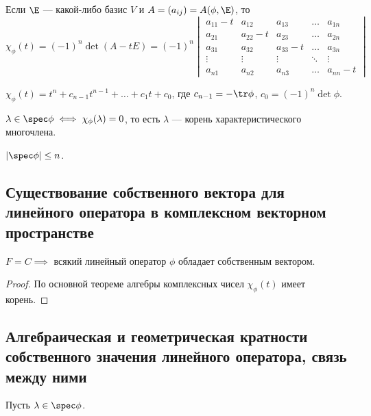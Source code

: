 Если $\E$ --- какой-либо базис $V$ и $A = (a_{ij}) = A(\phi, \E)$, то
\begin{equation*}
    \chi_\phi(t) = (-1)^n \det (A - tE) = (-1)^n \begin{vmatrix} 
        a_{11} - t & a_{12} & a_{13} & \dots & a_{1n} \\ 
        a_{21} & a_{22} - t & a_{23} & \dots & a_{2n} \\
        a_{31} & a_{32} & a_{33} - t & \dots & a_{3n} \\
        \vdots & \vdots & \vdots & \ddots & \vdots \\
        a_{n1} & a_{n2} & a_{n3} & \dots & a_{nn} - t
    \end{vmatrix}
\end{equation*}

$\chi_\phi(t) = t^n + c_{n - 1}t^{n - 1} + \dots + c_1 t + c_0$, где $c_{n - 1} = -\tr \phi$, $c_0 = (-1)^n \det \phi$.

\begin{corollary}
    $\lambda \in \spec \phi \iff \chi_\phi(\lambda) = 0$, то есть $\lambda$ --- корень характеристического многочлена.
\end{corollary}

\begin{corollary}
    $|\spec \phi| \leq n$.   
\end{corollary}


\subsection{Существование собственного вектора для линейного оператора в комплексном векторном пространстве}

\begin{corollary}
    $F = C \implies $ всякий линейный оператор $\phi$ обладает собственным вектором.
\end{corollary}

\begin{proof}
    По основной теореме алгебры комплексных чисел $\chi_\phi(t)$ имеет корень. 
\end{proof}


\subsection{Алгебраическая и геометрическая кратности собственного значения линейного оператора, связь между ними}

Пусть $\lambda \in \spec \phi$.

